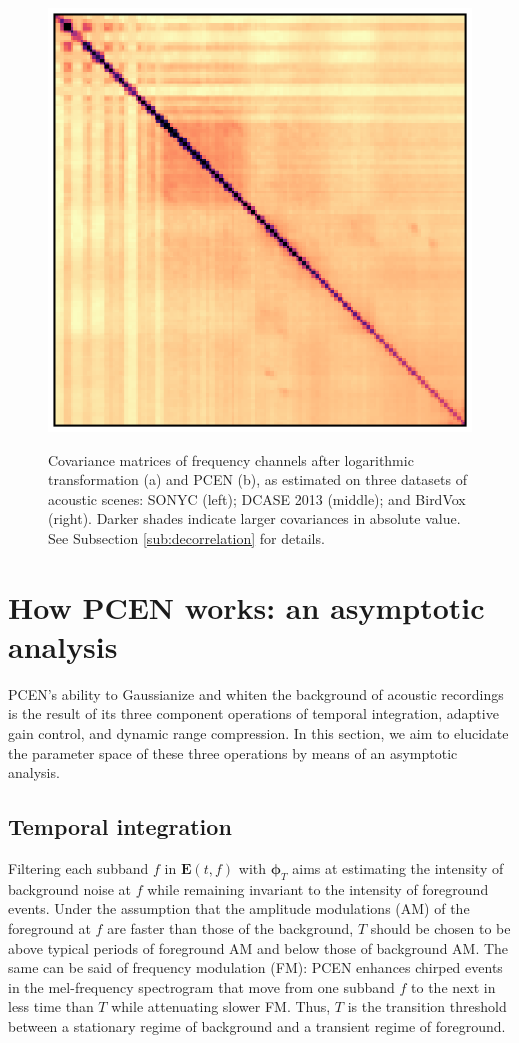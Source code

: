 \documentclass[journal]{IEEEtran}
\theoremstyle{remark}
\begin{document}
\begin{figure}
{\includegraphics[width=0.33\linewidth]{BirdVox-pcen_PCEN_covariance.eps}}
\caption{Covariance matrices of frequency channels after logarithmic transformation (a) and PCEN (b), as estimated on three datasets of acoustic scenes: SONYC (left); DCASE 2013 (middle); and BirdVox (right).
Darker shades indicate larger covariances in absolute value. See Subsection \ref{sub:decorrelation} for details.}
\label{fig:decorrelation}
\end{figure}



\section{How PCEN works: an asymptotic analysis \label{sec:asymptotic}}
PCEN's ability to Gaussianize and whiten the background of acoustic recordings is the result of its three component operations of temporal integration, adaptive gain control, and dynamic range compression.
In this section, we aim to elucidate the parameter space of these three operations by means of an asymptotic analysis.

\subsection{Temporal integration}
\label{sub:temporal-integration}
Filtering each subband $f$ in $\mathbf{E}(t,f)$ with $\boldsymbol{\phi}_T$ aims at estimating the intensity of background noise at $f$ while remaining invariant to the intensity of foreground events.
Under the assumption that the amplitude modulations (AM) of the foreground at $f$ are faster than those of the background, $T$ should be chosen to be above typical periods of foreground AM and below those of background AM.
The same can be said of frequency modulation (FM): PCEN enhances chirped events in the mel-frequency spectrogram that move from one subband $f$ to the next in less time than $T$ while attenuating slower FM.
Thus, $T$ is the transition threshold between a stationary regime of background and a transient regime of foreground.
\end{document}
